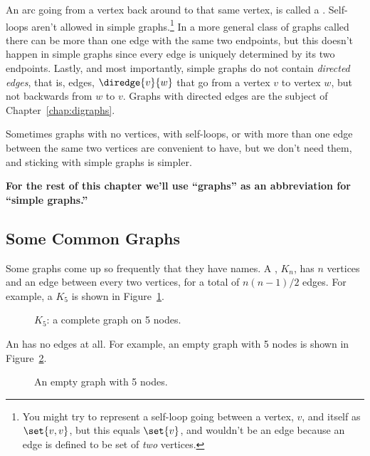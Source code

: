 An arc going from a vertex back around to that same vertex, is called
a .  Self-loops aren't allowed in simple
graphs.\footnote{You might try to represent a self-loop going between
  a vertex, $v$, and itself as $\set{v, v}$, but this equals
  $\set{v}$, and wouldn't be an edge because an edge is defined to be
  set of \emph{two} vertices.}  In a more general class of graphs
called  there can be more than one edge with the
same two endpoints, but this doesn't happen in simple graphs since
every edge is uniquely determined by its two endpoints.    Lastly, and most importantly, simple graphs do not
contain \emph{directed edges}, that is, edges, $\diredge{v}{w}$ that
go from a vertex $v$ to vertex $w$, but not backwards  from $w$ to $v$.   Graphs with directed
edges are the subject of Chapter~\ref{chap:digraphs}.

Sometimes graphs with no vertices, with self-loops, or with more than one
edge between the same two vertices are convenient to have, but we don't
need them, and sticking with simple graphs is simpler. \smiley

\textbf{For the rest of this chapter we'll use ``graphs'' as an
  abbreviation for ``simple graphs.''}

\subsection{Some Common Graphs}

Some graphs come up so frequently that they have names.  A
, $K_n$, has $n$ vertices and an edge between
every two vertices, for a total of $n(n-1)/2$ edges.  For example,
a $K_5$ is shown in Figure~\ref{fig:K_5}.

\begin{figure}


\caption{$K_5$: a complete graph on 5 nodes.}
\label{fig:K_5}
\end{figure}

An  has no edges at all.  For example, an empty
graph with 5 nodes is shown in Figure~\ref{fig:graph_empty_5}.

\begin{figure}


\caption{An empty graph with 5 nodes.}
\label{fig:graph_empty_5}
\end{figure}


